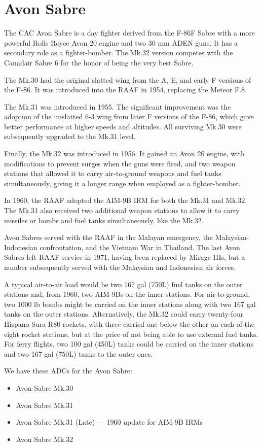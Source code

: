 \section*{Avon Sabre}

\setlength{\parskip}{\smallskipamount}
\setlength{\parindent}{0pt}

The CAC Avon Sabre is a day fighter derived from the F-86F Sabre with a more powerful Rolls Royce Avon 20 engine and two 30 mm ADEN guns. It has a secondary role as a fighter-bomber. The Mk.32 version competes with the Canadair Sabre 6 for the honor of being the very best Sabre.

The Mk.30 had the original slatted wing from the A, E, and early F versions of the F-86. It was introduced into the RAAF in 1954, replacing the Meteor F.8.

The Mk.31 was introduced in 1955. The significant improvement was the adoption of the unslatted 6-3 wing from later F versions of the F-86, which gave better performance at higher speeds and altitudes. All surviving Mk.30 were subsequently upgraded to the Mk.31 level. 

Finally, the Mk.32 was introduced in 1956. It gained an Avon 26 engine, with modifications to prevent surges when the guns were fired, and two weapon stations that allowed it to carry air-to-ground weapons and fuel tanks simultaneously, giving it a longer range when employed as a fighter-bomber.

In 1960, the RAAF adopted the AIM-9B IRM for both the Mk.31 and Mk.32. The Mk.31 also received two additional weapon stations to allow it to carry missiles or bombs and fuel tanks simultaneously, like the Mk.32.

Avon Sabres served with the RAAF in the Malayan emergency, the Malaysian-Indonesian confrontation, and the Vietnam War in Thailand. The last Avon Sabres left RAAF service in 1971, having been replaced by Mirage IIIs, but a number subsequently served with the Malaysian and Indonesian air forces.

A typical air-to-air load would be two 167 gal (750L) fuel tanks on the outer stations and, from 1960, two AIM-9Bs on the inner stations. For air-to-ground, two 1000 lb bombs might be carried on the inner stations along with two 167 gal tanks on the outer stations. Alternatively, the Mk.32 could carry twenty-four Hispano Sura R80 rockets, with three carried one below the other on each of the eight rocket stations, but at the price of not being able to use external fuel tanks. For ferry flights, two 100 gal (450L) tanks could be carried on the inner stations and two 167 gal (750L) tanks to the outer ones.

We have these ADCs for the Avon Sabre:
\begin{itemize}
\item Avon Sabre Mk.30
\item Avon Sabre Mk.31
\item Avon Sabre Mk.31 (Late) –– 1960 update for AIM-9B IRMs
\item Avon Sabre Mk.32
\end{itemize}
